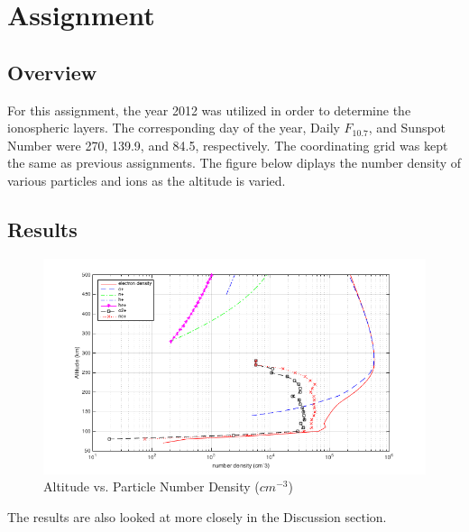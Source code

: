 \section{Assignment}

\subsection{Overview}
For this assignment, the year 2012 was utilized  in order to determine the ionospheric layers. The corresponding day of the year, Daily $F_{10.7}$, and Sunspot Number were 270, 139.9, and 84.5, respectively. The coordinating grid was kept the same as previous assignments. The figure below diplays the number density of various particles and ions as the altitude is varied. 
\newpage
\subsection{Results}

	\begin{figure}[!h]
		\centering
		\includegraphics[width=\linewidth]{images/ass5_properties_plot}
		\caption{Altitude vs. Particle Number Density ($cm^{-3}$)}
	\end{figure}
The results are also looked at more closely in the
 Discussion section.
